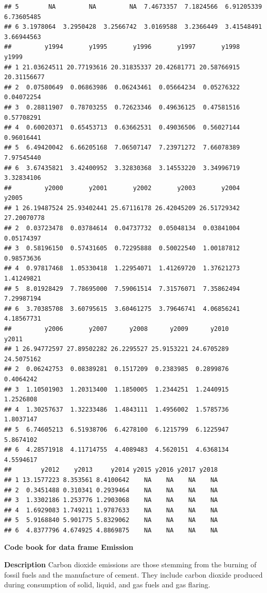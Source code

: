 \documentclass[
]{book}
\begin{document}
\begin{verbatim}
## 5        NA         NA         NA  7.4673357  7.1824566  6.91205339  6.73605485
## 6 3.1978064  3.2950428  3.2566742  3.0169588  3.2366449  3.41548491  3.66944563
##         y1994       y1995       y1996       y1997       y1998       y1999
## 1 21.03624511 20.77193616 20.31835337 20.42681771 20.58766915 20.31156677
## 2  0.07580649  0.06863986  0.06243461  0.05664234  0.05276322  0.04072254
## 3  0.28811907  0.78703255  0.72623346  0.49636125  0.47581516  0.57708291
## 4  0.60020371  0.65453713  0.63662531  0.49036506  0.56027144  0.96016441
## 5  6.49420042  6.66205168  7.06507147  7.23971272  7.66078389  7.97545440
## 6  3.67435821  3.42400952  3.32830368  3.14553220  3.34996719  3.32834106
##         y2000       y2001       y2002       y2003       y2004       y2005
## 1 26.19487524 25.93402441 25.67116178 26.42045209 26.51729342 27.20070778
## 2  0.03723478  0.03784614  0.04737732  0.05048134  0.03841004  0.05174397
## 3  0.58196150  0.57431605  0.72295888  0.50022540  1.00187812  0.98573636
## 4  0.97817468  1.05330418  1.22954071  1.41269720  1.37621273  1.41249821
## 5  8.01928429  7.78695000  7.59061514  7.31576071  7.35862494  7.29987194
## 6  3.70385708  3.60795615  3.60461275  3.79646741  4.06856241  4.18567731
##         y2006       y2007      y2008      y2009      y2010      y2011
## 1 26.94772597 27.89502282 26.2295527 25.9153221 24.6705289 24.5075162
## 2  0.06242753  0.08389281  0.1517209  0.2383985  0.2899876  0.4064242
## 3  1.10501903  1.20313400  1.1850005  1.2344251  1.2440915  1.2526808
## 4  1.30257637  1.32233486  1.4843111  1.4956002  1.5785736  1.8037147
## 5  6.74605213  6.51938706  6.4278100  6.1215799  6.1225947  5.8674102
## 6  4.28571918  4.11714755  4.4089483  4.5620151  4.6368134  4.5594617
##        y2012    y2013     y2014 y2015 y2016 y2017 y2018
## 1 13.1577223 8.353561 8.4100642    NA    NA    NA    NA
## 2  0.3451488 0.310341 0.2939464    NA    NA    NA    NA
## 3  1.3302186 1.253776 1.2903068    NA    NA    NA    NA
## 4  1.6929083 1.749211 1.9787633    NA    NA    NA    NA
## 5  5.9168840 5.901775 5.8329062    NA    NA    NA    NA
## 6  4.8377796 4.674925 4.8869875    NA    NA    NA    NA
\end{verbatim}

\textbf{Code book for data frame Emission}

\textbf{Description}
Carbon dioxide emissions are those stemming from the burning of fossil fuels and the manufacture of cement. They include carbon dioxide produced during consumption of solid, liquid, and gas fuels and gas flaring.
\end{document}
